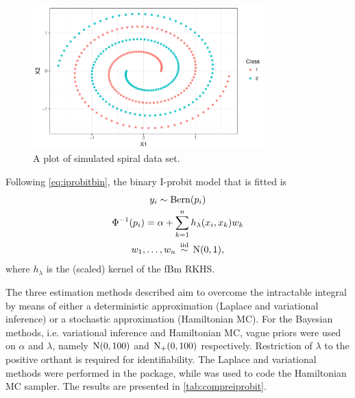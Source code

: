 \begin{figure}[hbt]
  \centering
  \includegraphics[width=0.8\textwidth]{figure/05-example_data}
  \caption{A plot of simulated spiral data set.}
  \label{fig:exampleiprobit}
\end{figure}

Following \cref{eq:iprobitbin}, the binary I-probit model that is fitted is
\begin{gather*}
  y_i \sim \operatorname{Bern}(p_i) \\
  \Phi^{-1}(p_i) = \alpha + \sum_{k=1}^n h_\lambda(x_i,x_k)w_k  \\
  w_1,\dots,w_n \,\overset{\text{iid}}{\sim}\, \operatorname{N}(0,1),
\end{gather*}
where $h_\lambda$ is the (scaled) kernel of the fBm RKHS.

The three estimation methods described aim to overcome the intractable integral by means of either a deterministic approximation (Laplace and variational inference) or a stochastic approximation (Hamiltonian MC).
For the Bayesian methods, i.e. variational inference and Hamiltonian MC, vague priors were used on $\alpha$ and $\lambda$, namely $\operatorname{N}(0,100)$ and $\operatorname{N}_+(0,100)$ respectively.
Restriction of $\lambda$ to the positive orthant is required for identifiability.
The Laplace and variational methods were performed in the  package, while  was used to code the Hamiltonian MC sampler.
The results are presented in \cref{tab:compreiprobit}.

